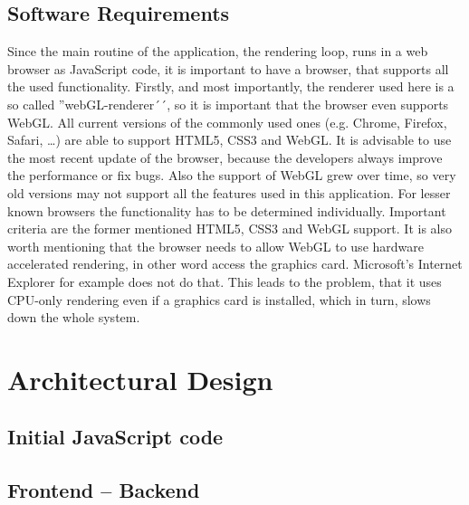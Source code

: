 \subsection{Software Requirements} \label{SoftReq}
Since the main routine of the application, the rendering loop, runs in a web browser as JavaScript code, it is important to have a browser, that supports all the used functionality. Firstly, and most importantly, the renderer used here is a so called ''webGL-renderer´´, so it is important that the browser even supports WebGL. All current versions of the commonly used ones (e.g. Chrome, Firefox, Safari, \ldots) are able to support HTML5, CSS3 and WebGL. It is advisable to use the most recent update of the browser, because the developers always improve the performance or fix bugs. Also the support of WebGL grew over time, so very old versions may not support all the features used in this application. For lesser known browsers the functionality has to be determined individually. Important criteria are the former mentioned HTML5, CSS3 and WebGL support. It is also worth mentioning that the browser needs to allow WebGL to use hardware accelerated rendering, in other word access the graphics card. Microsoft's Internet Explorer for example does not do that. This leads to the problem, that it uses CPU-only rendering even if a graphics card is installed, which in turn, slows down the whole system.
\section{Architectural Design}
\subsection{Initial JavaScript code}
\subsection{Frontend -- Backend}